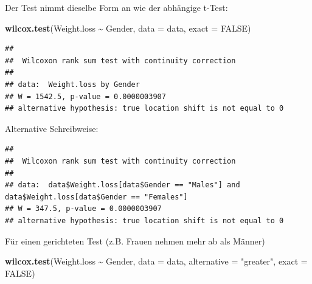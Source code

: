 \documentclass[
]{book}
\newenvironment{Shaded}{\begin{snugshade}}{\end{snugshade}}
\newcommand{\AttributeTok}[1]{\textcolor[rgb]{0.13,0.29,0.53}{#1}}
\newcommand{\ConstantTok}[1]{\textcolor[rgb]{0.56,0.35,0.01}{#1}}
\newcommand{\FunctionTok}[1]{\textcolor[rgb]{0.13,0.29,0.53}{\textbf{#1}}}
\newcommand{\NormalTok}[1]{#1}
\newcommand{\SpecialCharTok}[1]{\textcolor[rgb]{0.81,0.36,0.00}{\textbf{#1}}}
\newcommand{\StringTok}[1]{\textcolor[rgb]{0.31,0.60,0.02}{#1}}
\begin{document}
Der Test nimmt dieselbe Form an wie der abhängige t-Test:

\begin{Shaded}
\begin{Highlighting}[]
\FunctionTok{wilcox.test}\NormalTok{(Weight.loss }\SpecialCharTok{\textasciitilde{}}\NormalTok{ Gender, }\AttributeTok{data =}\NormalTok{ data, }\AttributeTok{exact =} \ConstantTok{FALSE}\NormalTok{)}
\end{Highlighting}
\end{Shaded}

\begin{verbatim}
## 
##  Wilcoxon rank sum test with continuity correction
## 
## data:  Weight.loss by Gender
## W = 1542.5, p-value = 0.0000003907
## alternative hypothesis: true location shift is not equal to 0
\end{verbatim}

Alternative Schreibweise:

\begin{Shaded}
\end{Shaded}

\begin{verbatim}
## 
##  Wilcoxon rank sum test with continuity correction
## 
## data:  data$Weight.loss[data$Gender == "Males"] and data$Weight.loss[data$Gender == "Females"]
## W = 347.5, p-value = 0.0000003907
## alternative hypothesis: true location shift is not equal to 0
\end{verbatim}

Für einen gerichteten Test (z.B. Frauen nehmen mehr ab als Männer)

\begin{Shaded}
\begin{Highlighting}[]
\FunctionTok{wilcox.test}\NormalTok{(Weight.loss }\SpecialCharTok{\textasciitilde{}}\NormalTok{ Gender, }\AttributeTok{data =}\NormalTok{ data, }\AttributeTok{alternative =} \StringTok{"greater"}\NormalTok{, }\AttributeTok{exact =} \ConstantTok{FALSE}\NormalTok{)}
\end{Highlighting}
\end{Shaded}
\end{document}

